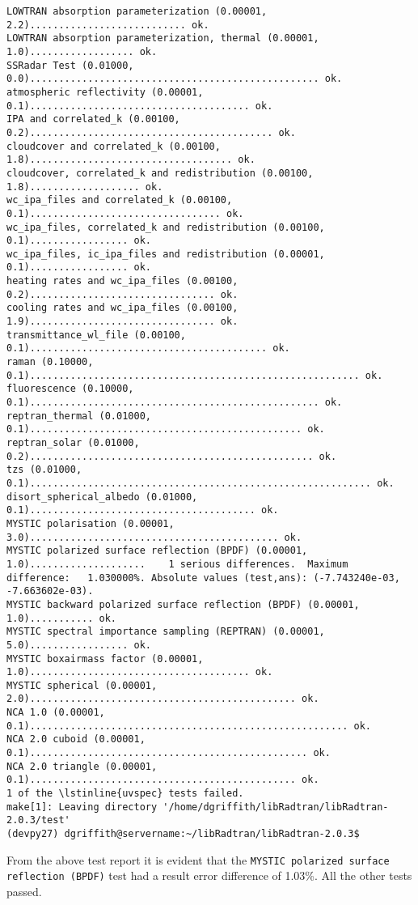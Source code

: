 \begin{enumerate}
\begin{lstlisting}[style=tinysize]
LOWTRAN absorption parameterization (0.00001,   2.2)........................... ok.
LOWTRAN absorption parameterization, thermal (0.00001,   1.0).................. ok.
SSRadar Test (0.01000,   0.0).................................................. ok.
atmospheric reflectivity (0.00001,   0.1)...................................... ok.
IPA and correlated_k (0.00100,   0.2).......................................... ok.
cloudcover and correlated_k (0.00100,   1.8)................................... ok.
cloudcover, correlated_k and redistribution (0.00100,   1.8)................... ok.
wc_ipa_files and correlated_k (0.00100,   0.1)................................. ok.
wc_ipa_files, correlated_k and redistribution (0.00100,   0.1)................. ok.
wc_ipa_files, ic_ipa_files and redistribution (0.00001,   0.1)................. ok.
heating rates and wc_ipa_files (0.00100,   0.2)................................ ok.
cooling rates and wc_ipa_files (0.00100,   1.9)................................ ok.
transmittance_wl_file (0.00100,   0.1)......................................... ok.
raman (0.10000,   0.1)......................................................... ok.
fluorescence (0.10000,   0.1).................................................. ok.
reptran_thermal (0.01000,   0.1)............................................... ok.
reptran_solar (0.01000,   0.2)................................................. ok.
tzs (0.01000,   0.1)........................................................... ok.
disort_spherical_albedo (0.01000,   0.1)....................................... ok.
MYSTIC polarisation (0.00001,   3.0)........................................... ok.
MYSTIC polarized surface reflection (BPDF) (0.00001,   1.0)....................    1 serious differences.  Maximum difference:   1.030000%. Absolute values (test,ans): (-7.743240e-03, -7.663602e-03).
MYSTIC backward polarized surface reflection (BPDF) (0.00001,   1.0)........... ok.
MYSTIC spectral importance sampling (REPTRAN) (0.00001,   5.0)................. ok.
MYSTIC boxairmass factor (0.00001,   1.0)...................................... ok.
MYSTIC spherical (0.00001,   2.0).............................................. ok.
NCA 1.0 (0.00001,   0.1)....................................................... ok.
NCA 2.0 cuboid (0.00001,   0.1)................................................ ok.
NCA 2.0 triangle (0.00001,   0.1).............................................. ok.
1 of the \lstinline{uvspec} tests failed.
make[1]: Leaving directory '/home/dgriffith/libRadtran/libRadtran-2.0.3/test'
(devpy27) dgriffith@servername:~/libRadtran/libRadtran-2.0.3$
\end{lstlisting}

From the above test report it is evident that the \lstinline{MYSTIC polarized surface reflection (BPDF)} test had a result error difference of 1.03\%.
All the other tests passed.

\end{enumerate}

